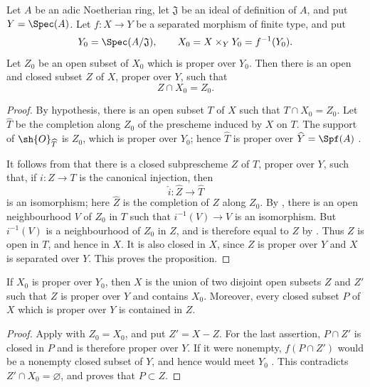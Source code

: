\begin{proposition}[5.5.1]
\label{III.5.5.1}
Let $A$ be an adic Noetherian ring, let $\mathfrak{J}$ be an ideal
of definition of $A$, and put $Y=\Spec(A)$.  Let $f:X\to Y$ be a
separated morphism of finite type, and put
\[
  Y_0=\Spec(A/\mathfrak{J}),\qquad
  X_0=X\times_Y Y_0=f^{-1}(Y_0).
\]
Let $Z_0$ be an open subset of $X_0$ which is proper over $Y_0$.
Then there is an open and closed subset $Z$ of $X$, proper over
$Y$, such that
\[
  Z\cap X_0=Z_0.
\]
\end{proposition}

\begin{proof}
By hypothesis, there is an open subset $T$ of $X$ such that
$T\cap X_0=Z_0$.  Let $\widehat{T}$ be the completion along $Z_0$
of the prescheme induced by $X$ on $T$.  The support of
$\sh{O}_{\widehat{T}}$ is $Z_0$, which is proper over $Y_0$;
hence $\widehat{T}$ is proper over
$\widehat{Y}=\Spf(A)$ .

It follows from  that there is a closed
subprescheme $Z$ of $T$, proper over $Y$, such that, if
$i:Z\to T$ is the canonical injection, then
\[
  \widehat{i}:\widehat{Z}\longrightarrow\widehat{T}
\]
is an isomorphism; here $\widehat{Z}$ is the completion of $Z$
along $Z_0$.  By , there is an open neighbourhood
$V$ of $Z_0$ in $T$ such that
$i^{-1}(V)\to V$ is an isomorphism.  But $i^{-1}(V)$ is a
neighbourhood of $Z_0$ in $Z$, and is therefore equal to $Z$ by
.  Thus $Z$ is open in $T$, and hence in $X$.
It is also closed in $X$, since $Z$ is proper over $Y$ and $X$ is
separated over $Y$.  This proves the proposition.
\end{proof}

\begin{corollary}[5.5.2]
\label{III.5.5.2}
If $X_0$ is proper over $Y_0$, then $X$ is the union of two
disjoint open subsets $Z$ and $Z'$ such that $Z$ is proper over
$Y$ and contains $X_0$.  Moreover, every closed subset $P$ of $X$
which is proper over $Y$ is contained in $Z$.
\end{corollary}

\begin{proof}
Apply  with $Z_0=X_0$, and put $Z'=X-Z$.  For the
last assertion, $P\cap Z'$ is closed in $P$ and is therefore proper
over $Y$.  If it were nonempty, $f(P\cap Z')$ would be a nonempty
closed subset of $Y$, and hence would meet $Y_0$
.  This contradicts
$Z'\cap X_0=\varnothing$, and proves that $P\subset Z$.
\end{proof}

